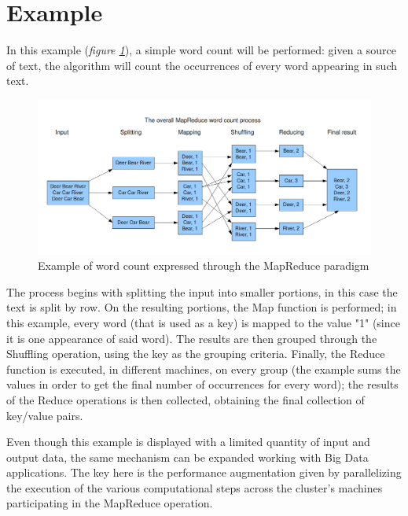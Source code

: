 \section{Example}
In this example (\textit{figure \ref{fig:mapreduce_example}}), a simple word count will be performed: given a source of text, the algorithm will count the occurrences of every word appearing in such text.

\begin{figure}[H]
    \centering
    \includegraphics[scale=0.44]{document/chapters/chapter_4/images/mapreduce_example.png}
    \caption{Example of word count expressed through the MapReduce paradigm \cite{mapreduce_example_site}}
    \label{fig:mapreduce_example}
\end{figure}

The process begins with splitting the input into smaller portions, in this case the text is split by row. On the resulting portions, the Map function is performed; in this example, every word (that is used as a key) is mapped to the value "1" (since it is one appearance of said word). The results are then grouped through the Shuffling operation, using the key as the grouping criteria. Finally, the Reduce function is executed, in different machines, on every group (the example sums the values in order to get the final number of occurrences for every word); the results of the Reduce operations is then collected, obtaining the final collection of key/value pairs.

Even though this example is displayed with a limited quantity of input and output data, the same mechanism can be expanded working with Big Data applications. The key here is the performance augmentation given by parallelizing the execution of the various computational steps across the cluster's machines participating in the MapReduce operation.